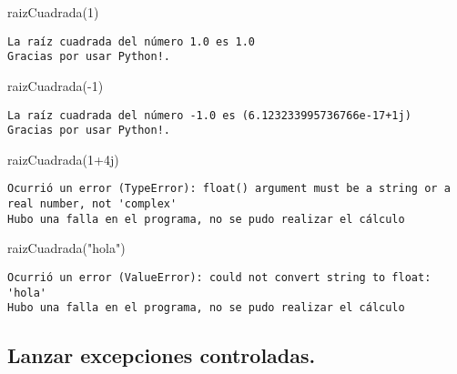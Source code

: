 \documentclass[
  letterpaper,
  DIV=11,
  numbers=noendperiod]{scrreprt}
\newenvironment{Shaded}{\begin{snugshade}}{\end{snugshade}}
\newcommand{\DecValTok}[1]{\textcolor[rgb]{0.68,0.00,0.00}{#1}}
\newcommand{\NormalTok}[1]{\textcolor[rgb]{0.00,0.23,0.31}{#1}}
\newcommand{\OperatorTok}[1]{\textcolor[rgb]{0.37,0.37,0.37}{#1}}
\newcommand{\OtherTok}[1]{\textcolor[rgb]{0.00,0.23,0.31}{#1}}
\newcommand{\StringTok}[1]{\textcolor[rgb]{0.13,0.47,0.30}{#1}}
\begin{document}
\begin{Shaded}
\begin{Highlighting}[]
\NormalTok{raizCuadrada(}\DecValTok{1}\NormalTok{)}
\end{Highlighting}
\end{Shaded}

\begin{verbatim}
La raíz cuadrada del número 1.0 es 1.0
Gracias por usar Python!.
\end{verbatim}

\begin{Shaded}
\begin{Highlighting}[]
\NormalTok{raizCuadrada(}\OperatorTok{{-}}\DecValTok{1}\NormalTok{)}
\end{Highlighting}
\end{Shaded}

\begin{verbatim}
La raíz cuadrada del número -1.0 es (6.123233995736766e-17+1j)
Gracias por usar Python!.
\end{verbatim}

\begin{Shaded}
\begin{Highlighting}[]
\NormalTok{raizCuadrada(}\DecValTok{1}\OperatorTok{+}\OtherTok{4j}\NormalTok{)}
\end{Highlighting}
\end{Shaded}

\begin{verbatim}
Ocurrió un error (TypeError): float() argument must be a string or a real number, not 'complex'
Hubo una falla en el programa, no se pudo realizar el cálculo
\end{verbatim}

\begin{Shaded}
\begin{Highlighting}[]
\NormalTok{raizCuadrada(}\StringTok{"hola"}\NormalTok{)}
\end{Highlighting}
\end{Shaded}

\begin{verbatim}
Ocurrió un error (ValueError): could not convert string to float: 'hola'
Hubo una falla en el programa, no se pudo realizar el cálculo
\end{verbatim}

\subsection{Lanzar excepciones
controladas.}\label{lanzar-excepciones-controladas.}
\end{document}
